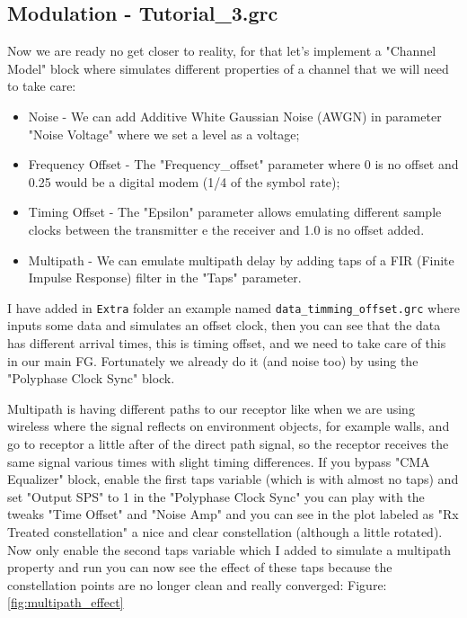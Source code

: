 \documentclass[a4paper, 10pt, conference]{ieeeconf}      %
\begin{document}
\subsection{Modulation - Tutorial\_3.grc}
    Now we are ready no get closer to reality, for that let's implement a "Channel Model" block where simulates different properties of a channel that we will need to take care:
    
\begin{itemize}
\item Noise - We can add Additive White Gaussian Noise (AWGN) in parameter "Noise Voltage" where we set a level as a voltage;
\item Frequency Offset - The "Frequency\_offset" parameter where 0 is no offset and 0.25 would be a digital modem (1/4 of the symbol rate);
\item Timing Offset - The "Epsilon" parameter allows emulating different sample clocks between the transmitter e the receiver and 1.0 is no offset added.
\item Multipath - We can emulate multipath delay by adding taps of a FIR (Finite Impulse Response) filter in the "Taps" parameter.
\end{itemize}
    
    I have added in \verb|Extra| folder an example named \verb|data_timming_offset.grc| where inputs some data and simulates an offset clock, then you can see that the data has different arrival times, this is timing offset, and we need to take care of this in our main FG. Fortunately we already do it (and noise too) by using the "Polyphase Clock Sync" block. 
    
    
    Multipath is having different paths to our receptor like when we are using wireless where the signal reflects on environment objects, for example walls, and go to receptor a little after of the direct path signal, so the receptor receives the same signal various times with slight timing differences. 
    If you bypass "CMA Equalizer" block, enable the first taps variable (which is with almost no taps) and set "Output SPS" to 1 in the "Polyphase Clock Sync" you can play with the tweaks "Time Offset" and "Noise Amp" and you can see in the plot labeled as "Rx Treated constellation" a nice and clear constellation (although a little rotated). Now only enable the second taps variable which I added to simulate a multipath property and run you can now see the effect of these taps because the constellation points are no longer clean and really converged: Figure:  \ref{fig:multipath_effect}
    
\end{document}

